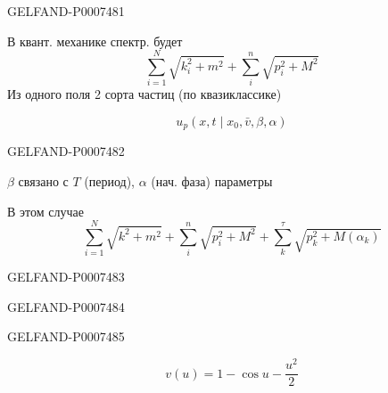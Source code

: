 \begin{GelfandAdjacentEvidence}{GELFAND-P000748}{1}

В квант. механике спектр. будет
\begin{equation*}
\sum_{i=1}^{N}\sqrt{k_i^2+m^2}+\sum_i^n\sqrt{p_i^2+M^2}
\tag{16}
\end{equation*}
Из одного поля 2 сорта частиц (по квазиклассике)

\begin{equation*}
u_p(x,t\mid x_0,\bar v,\beta,\alpha)
\tag{17}
\end{equation*}
\end{GelfandAdjacentEvidence}
\begin{GelfandAdjacentEvidence}{GELFAND-P000748}{2}

\(\beta\) связано с \(T\) (период), \(\alpha\) (нач. фаза) параметры

В этом случае
\begin{equation*}
\sum_{i=1}^{N}\sqrt{k^2+m^2}+\sum_i^n\sqrt{p_i^2+M^2}
+\sum_k^\tau\sqrt{p_k^2+M(\alpha_k)}
\tag{18}
\end{equation*}
\end{GelfandAdjacentEvidence}
\begin{GelfandAdjacentEvidence}{GELFAND-P000748}{3}

\end{GelfandAdjacentEvidence}
\begin{GelfandAdjacentEvidence}{GELFAND-P000748}{4}

\end{GelfandAdjacentEvidence}
\begin{GelfandAdjacentEvidence}{GELFAND-P000748}{5}


\begin{equation*}
v(u)=1-\cos u-\frac{u^2}{2}
\tag{19}
\end{equation*}
\end{GelfandAdjacentEvidence}
